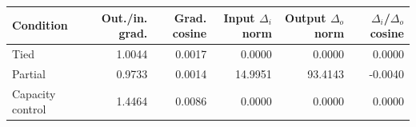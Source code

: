 \begin{tabular}{lrrrrr}
\toprule
Condition & Out./in. grad. & Grad. cosine & Input $\Delta_i$ norm & Output $\Delta_o$ norm & $\Delta_i$/$\Delta_o$ cosine \\
\midrule
Tied & 1.0044 & 0.0017 & 0.0000 & 0.0000 & 0.0000 \\
Partial & 0.9733 & 0.0014 & 14.9951 & 93.4143 & -0.0040 \\
Capacity control & 1.4464 & 0.0086 & 0.0000 & 0.0000 & 0.0000 \\
\bottomrule
\end{tabular}
